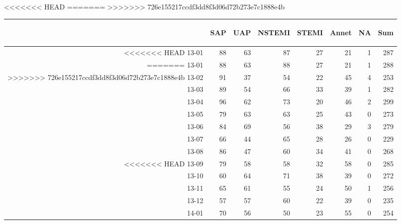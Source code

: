 \documentclass[presentation,xcolor=pdftex,dvipsnames,table]{beamer}
\begin{document}
\begin{frame}
\begin{tiny}
<<<<<<< HEAD
=======
>>>>>>> 726e155217ccdf3dd8f3d06d72b273e7c1888e4b
\begin{table}[ht]
\centering
\begin{tabular}{rrrrrrrr}
  \toprule
 & \begin{sideways} SAP \end{sideways} & \begin{sideways} UAP \end{sideways} & \begin{sideways} NSTEMI \end{sideways} & \begin{sideways} STEMI \end{sideways} & \begin{sideways} Annet \end{sideways} & \begin{sideways} NA \end{sideways} & \begin{sideways} Sum \end{sideways} \\ 
  \midrule
<<<<<<< HEAD
13-01 & 88 & 63 & 87 & 27 & 21 & 1 & 287 \\ 
=======
13-01 & 88 & 63 & 88 & 27 & 21 & 1 & 288 \\ 
>>>>>>> 726e155217ccdf3dd8f3d06d72b273e7c1888e4b
  13-02 & 91 & 37 & 54 & 22 & 45 & 4 & 253 \\ 
  13-03 & 89 & 54 & 66 & 33 & 39 & 1 & 282 \\ 
  13-04 & 96 & 62 & 73 & 20 & 46 & 2 & 299 \\ 
  13-05 & 79 & 63 & 63 & 25 & 43 & 0 & 273 \\ 
  13-06 & 84 & 69 & 56 & 38 & 29 & 3 & 279 \\ 
  13-07 & 66 & 44 & 65 & 28 & 26 & 0 & 229 \\ 
  13-08 & 86 & 47 & 60 & 34 & 41 & 0 & 268 \\ 
<<<<<<< HEAD
  13-09 & 79 & 58 & 58 & 32 & 58 & 0 & 285 \\ 
  13-10 & 60 & 64 & 71 & 38 & 39 & 0 & 272 \\ 
  13-11 & 65 & 61 & 55 & 24 & 50 & 1 & 256 \\ 
  13-12 & 57 & 57 & 60 & 22 & 39 & 0 & 235 \\ 
  14-01 & 70 & 56 & 50 & 23 & 55 & 0 & 254 \\ 

\end{tabular}
\end{table}
\end{tiny}
\end{frame}
\end{document}
